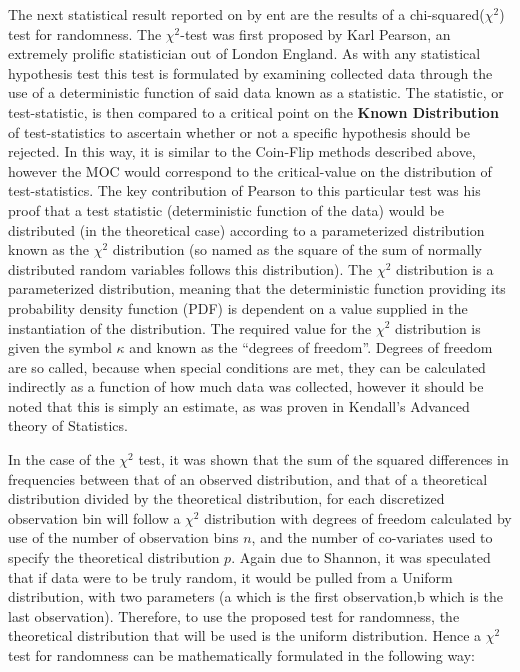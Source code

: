\documentclass{IEEEtran}
\begin{document}
The next statistical result reported on by ent are the results of a chi-squared($\chi^2$) test for randomness. The $\chi^2$-test was first proposed by Karl Pearson, an extremely prolific statistician out of London England. As with any statistical hypothesis test this test is formulated by examining collected data through the use of a deterministic function of said data known as a statistic. The statistic, or test-statistic, is then compared to a critical point on the \textbf{Known Distribution} of test-statistics to ascertain whether or not a specific hypothesis should be rejected. In this way, it is similar to the Coin-Flip methods described above, however the MOC would correspond to the critical-value on the distribution of test-statistics. The key contribution of Pearson to this particular test was his proof that a test statistic (deterministic function of the data) would be distributed (in the theoretical case) according to a parameterized distribution known as the $\chi^2$ distribution (so named as the square of the sum of normally distributed random variables follows this distribution). The $\chi^2$ distribution is a parameterized distribution, meaning that the deterministic function providing its probability density function (PDF) is dependent on a value supplied in the instantiation of the distribution. The required value for the $\chi^2$ distribution is given the symbol $\kappa$ and known as the ``degrees of freedom''. Degrees of freedom are so called, because when special conditions are met, they can be calculated indirectly as a function of how much data was collected, however it should be noted that this is simply an estimate, as was proven in Kendall's Advanced theory of Statistics.

In the case of the $\chi^2$ test, it was shown that the sum of the squared differences in frequencies between that of an observed distribution, and that of a theoretical distribution divided by the theoretical distribution, for each discretized observation bin will follow a $\chi^2$ distribution with degrees of freedom calculated by use of the number of observation bins $n$, and the number of co-variates used to specify the theoretical distribution $p$. Again due to Shannon, it was speculated that if data were to be truly random, it would be pulled from a Uniform distribution, with two parameters (a which is the first observation,b which is the last observation). Therefore, to use the proposed test for randomness, the theoretical distribution that will be used is the uniform distribution. Hence a $\chi^2$ test for randomness can be mathematically formulated in the following way: 
\end{document}
